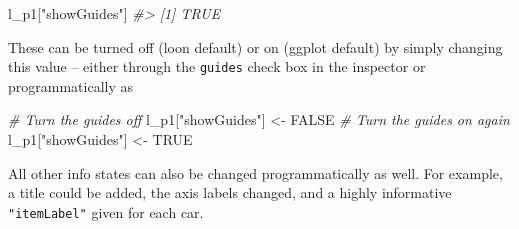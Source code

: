\documentclass[]{article}
\newenvironment{Shaded}{\begin{snugshade}}{\end{snugshade}}
\newcommand{\KeywordTok}[1]{\textcolor[rgb]{0.13,0.29,0.53}{\textbf{#1}}}
\newcommand{\DecValTok}[1]{\textcolor[rgb]{0.00,0.00,0.81}{#1}}
\newcommand{\CharTok}[1]{\textcolor[rgb]{0.31,0.60,0.02}{#1}}
\newcommand{\StringTok}[1]{\textcolor[rgb]{0.31,0.60,0.02}{#1}}
\newcommand{\CommentTok}[1]{\textcolor[rgb]{0.56,0.35,0.01}{\textit{#1}}}
\newcommand{\OtherTok}[1]{\textcolor[rgb]{0.56,0.35,0.01}{#1}}
\newcommand{\OperatorTok}[1]{\textcolor[rgb]{0.81,0.36,0.00}{\textbf{#1}}}
\newcommand{\NormalTok}[1]{#1}
\begin{document}
\begin{Shaded}
\begin{Highlighting}[]
\NormalTok{l_p1[}\StringTok{"showGuides"}\NormalTok{]}
\CommentTok{#> [1] TRUE}
\end{Highlighting}
\end{Shaded}

These can be turned off (loon default) or on (ggplot default) by simply
changing this value -- either through the \texttt{guides} check box in
the inspector or programmatically as

\begin{Shaded}
\begin{Highlighting}[]
\CommentTok{# Turn the guides off}
\NormalTok{l_p1[}\StringTok{"showGuides"}\NormalTok{] <-}\StringTok{ }\OtherTok{FALSE}
\CommentTok{# Turn the guides on again}
\NormalTok{l_p1[}\StringTok{"showGuides"}\NormalTok{] <-}\StringTok{ }\OtherTok{TRUE}
\end{Highlighting}
\end{Shaded}

All other info states can also be changed programmatically as well. For
example, a title could be added, the axis labels changed, and a highly
informative \texttt{"itemLabel"} given for each car.

\begin{Shaded}
\end{Shaded}
\end{document}
